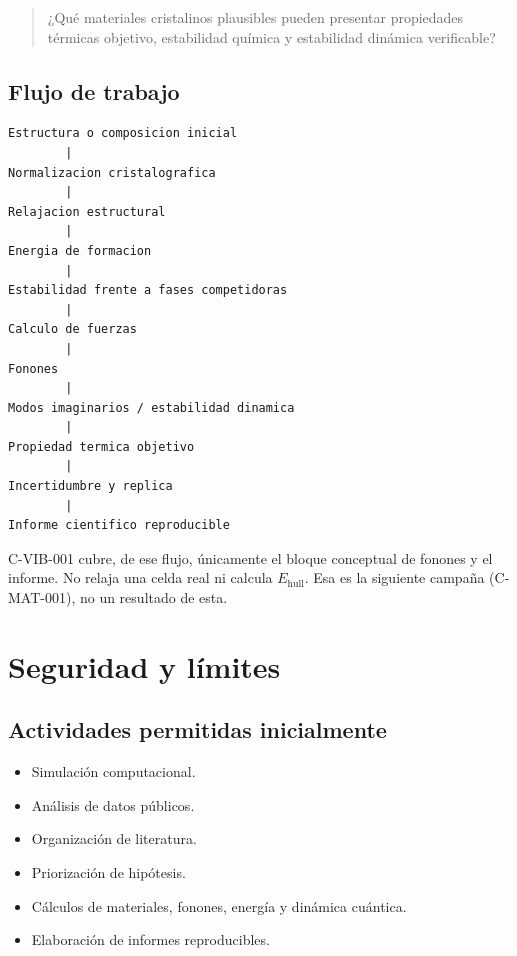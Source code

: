 \documentclass[11pt,a4paper]{article}
\newcommand{\Ehull}{E_{\mathrm{hull}}}
\begin{document}
\begin{quote}
¿Qué materiales cristalinos plausibles pueden presentar propiedades térmicas objetivo, estabilidad química y estabilidad dinámica verificable?
\end{quote}

\subsection{Flujo de trabajo}
\begin{lstlisting}
Estructura o composicion inicial
        |
Normalizacion cristalografica
        |
Relajacion estructural
        |
Energia de formacion
        |
Estabilidad frente a fases competidoras
        |
Calculo de fuerzas
        |
Fonones
        |
Modos imaginarios / estabilidad dinamica
        |
Propiedad termica objetivo
        |
Incertidumbre y replica
        |
Informe cientifico reproducible
\end{lstlisting}

C-VIB-001 cubre, de ese flujo, únicamente el bloque conceptual de fonones y el informe. No relaja una celda real ni calcula $\Ehull$. Esa es la siguiente campaña (C-MAT-001), no un resultado de esta.

\section{Seguridad y límites}
\label{sec:seguridad}

\subsection{Actividades permitidas inicialmente}
\begin{itemize}[itemsep=1pt]
    \item Simulación computacional.
    \item Análisis de datos públicos.
    \item Organización de literatura.
    \item Priorización de hipótesis.
    \item Cálculos de materiales, fonones, energía y dinámica cuántica.
    \item Elaboración de informes reproducibles.
\end{itemize}
\end{document}
